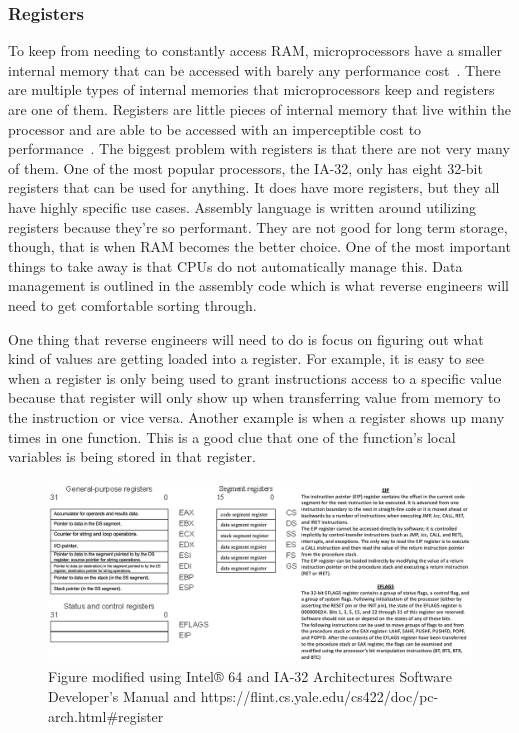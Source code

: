 \subsubsection{Registers}
To keep from needing to constantly access RAM, microprocessors have a smaller internal memory that can be accessed with barely any performance cost~\cite{Reversing}. 
There are multiple types of internal memories that microprocessors keep and registers are one of them.
Registers are little pieces of internal memory that live within the processor and are able to be accessed with an imperceptible cost to performance~\cite{PracticalRE}.
The biggest problem with registers is that there are not very many of them. 
One of the most popular processors, the IA-32, only has eight 32-bit registers that can be used for anything. 
It does have more registers, but they all have highly specific use cases. 
Assembly language is written around utilizing registers because they’re so performant. 
They are not good for long term storage, though, that is when RAM becomes the better choice. 
One of the most important things to take away is that CPUs do not automatically manage this. 
Data management is outlined in the assembly code which is what reverse engineers will need to get comfortable sorting through.

One thing that reverse engineers will need to do is focus on figuring out what kind of values are getting loaded into a register. 
For example, it is easy to see when a register is only being used to grant instructions access to a specific value because that register will only show up when transferring value from memory to the instruction or vice versa.
Another example is when a register shows up many times in one function. 
This is a good clue that one of the function's local variables is being stored in that register.
\begin{figure}[h]
    \caption{Figure modified using Intel® 64 and IA-32 Architectures Software Developer’s Manual and https://flint.cs.yale.edu/cs422/doc/pc-arch.html\#register}
    \includegraphics[scale=.27]{Register Diagram.jpeg}
\end{figure}

